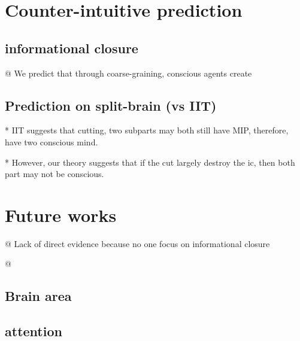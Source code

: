 \documentclass[utf8]{article}
\newenvironment{ants}
			{
			 \begin{easylist}[itemize]
			}
			{
			\end{easylist}
			}
\begin{document}
		
		
	\section{Counter-intuitive prediction}	
	
		\subsection{informational closure}
			\begin{ants}
				@ We predict that through coarse-graining, conscious agents create 
			\end{ants}
			
			
		
		\subsection{Prediction on split-brain (vs IIT)}
			* IIT suggests that cutting, two subparts may both still have MIP, therefore, have two conscious mind. 
			
			* However, our theory suggests that if the cut largely destroy the \ac{ic}, then both part may not be conscious. 
	
	
	

	
	
	
	\section{Future works}
		\begin{ants}
			
			@ Lack of direct evidence because no one focus on informational closure
			
			@
			
		\end{ants}
	
		\subsection{Brain area}
		\subsection{attention}
\end{document}
